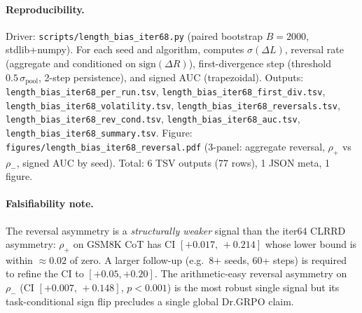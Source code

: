 \paragraph{Reproducibility.}
Driver: \texttt{scripts/length\_bias\_iter68.py} (paired bootstrap
$B=2000$, stdlib+numpy). For each seed and algorithm, computes
$\sigma(\Delta L)$, reversal rate (aggregate and conditioned on
$\mathrm{sign}(\Delta R)$), first-divergence step (threshold
$0.5\,\sigma_{\mathrm{pool}}$, 2-step persistence), and signed AUC
(trapezoidal). Outputs:
\texttt{length\_bias\_iter68\_per\_run.tsv},
\texttt{length\_bias\_iter68\_first\_div.tsv},
\texttt{length\_bias\_iter68\_volatility.tsv},
\texttt{length\_bias\_iter68\_reversals.tsv},
\texttt{length\_bias\_iter68\_rev\_cond.tsv},
\texttt{length\_bias\_iter68\_auc.tsv},
\texttt{length\_bias\_iter68\_summary.tsv}. Figure:
\texttt{figures/length\_bias\_iter68\_reversal.pdf} (3-panel:
aggregate reversal, $\rho_+$ vs $\rho_{-}$, signed AUC by seed).
Total: 6 TSV outputs (77 rows), 1 JSON meta, 1 figure.

\paragraph{Falsifiability note.}
The reversal asymmetry is a \emph{structurally weaker} signal than
the iter64 CLRRD asymmetry: $\rho_+$ on GSM8K CoT has CI
$[+0.017,\, +0.214]$ whose lower bound is within $\approx 0.02$ of
zero. A larger follow-up (e.g.\ 8+ seeds, 60+ steps) is required to
refine the CI to $[+0.05, +0.20]$. The arithmetic-easy reversal
asymmetry on $\rho_{-}$ (CI $[+0.007,\, +0.148]$, $p < 0.001$) is the
most robust single signal but its task-conditional sign flip
precludes a single global Dr.GRPO claim.